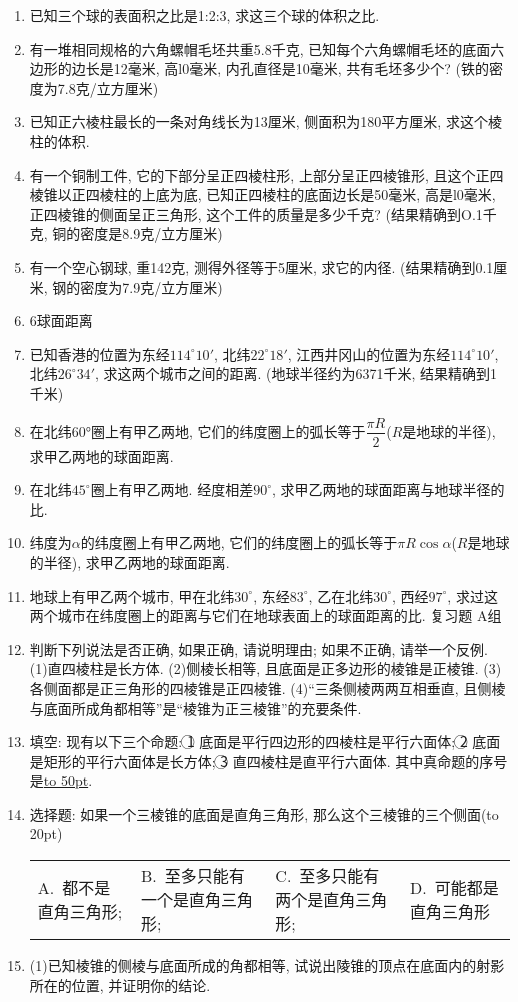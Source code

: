 \documentclass[10pt,a4paper]{article}
\newcommand{\blank}[1]{\underline{\hbox to #1pt{}}}
\newcommand{\bracket}[1]{(\hbox to #1pt{})}
\newcommand{\fourch}[4]{\par\begin{tabular}{p{.23\textwidth}p{.23\textwidth}p{.23\textwidth}p{.23\textwidth}}
A.~#1 &B.~#2& C.~#3& D.~#4
\end{tabular}}
\begin{document}
\begin{enumerate}[1.]
\item 已知三个球的表面积之比是1:2:3, 求这三个球的体积之比.
\item 有一堆相同规格的六角螺帽毛坯共重5.8千克, 已知每个六角螺帽毛坯的底面六边形的边长是12毫米, 高l0毫米, 内孔直径是10毫米, 共有毛坯多少个? (铁的密度为7.8克/立方厘米)
\item 已知正六棱柱最长的一条对角线长为13厘米, 侧面积为180平方厘米, 求这个棱柱的体积.
\item 有一个铜制工件, 它的下部分呈正四棱柱形, 上部分呈正四棱锥形, 且这个正四棱锥以正四棱柱的上底为底, 已知正四棱柱的底面边长是50毫米, 高是l0毫米, 正四棱锥的侧面呈正三角形, 这个工件的质量是多少千克? (结果精确到O.1千克, 铜的密度是8.9克/立方厘米)
\item 有一个空心钢球, 重142克, 测得外径等于5厘米, 求它的内径. (结果精确到0.1厘米, 钢的密度为7.9克/立方厘米)
\item 6球面距离
\item 已知香港的位置为东经$114^\circ 10'$, 北纬$22^\circ 18'$, 江西井冈山的位置为东经$114^\circ 10'$, 北纬$26^\circ 34'$, 求这两个城市之间的距离. (地球半径约为6371千米, 结果精确到1千米)
\item 在北纬60°圈上有甲乙两地, 它们的纬度圈上的弧长等于$\dfrac{\pi R}2$($R$是地球的半径), 求甲乙两地的球面距离.
\item 在北纬$45^\circ$圈上有甲乙两地. 经度相差$90^\circ$, 求甲乙两地的球面距离与地球半径的比.
\item 纬度为$\alpha$的纬度圈上有甲乙两地, 它们的纬度圈上的弧长等于$\pi R\cos \alpha$($R$是地球的半径), 求甲乙两地的球面距离.
\item 地球上有甲乙两个城市, 甲在北纬$30^\circ$, 东经$83^\circ$, 乙在北纬$30^\circ$, 西经$97^\circ$, 求过这两个城市在纬度圈上的距离与它们在地球表面上的球面距离的比.
复习题
A组
\item 判断下列说法是否正确, 如果正确, 请说明理由; 如果不正确, 请举一个反例.
(1)直四棱柱是长方体.
(2)侧棱长相等, 且底面是正多边形的棱锥是正棱锥.
(3)各侧面都是正三角形的四棱锥是正四棱锥.
(4)``三条侧棱两两互相垂直, 且侧棱与底面所成角都相等''是``棱锥为正三棱锥''的充要条件.
\item 填空:
现有以下三个命题: \textcircled{1} 底面是平行四边形的四棱柱是平行六面体; \textcircled{2} 底面是矩形的平行六面体是长方体; \textcircled{3} 直四棱柱是直平行六面体. 其中真命题的序号是\blank{50}.
\item 选择题:
如果一个三棱锥的底面是直角三角形, 那么这个三棱锥的三个侧面\bracket{20}
\fourch{都不是直角三角形;}{至多只能有一个是直角三角形;}{至多只能有两个是直角三角形;}{可能都是直角三角形}
\item (1)已知棱锥的侧棱与底面所成的角都相等, 试说出陵锥的顶点在底面内的射影所在的位置, 并证明你的结论.

\end{enumerate}
\end{document}
